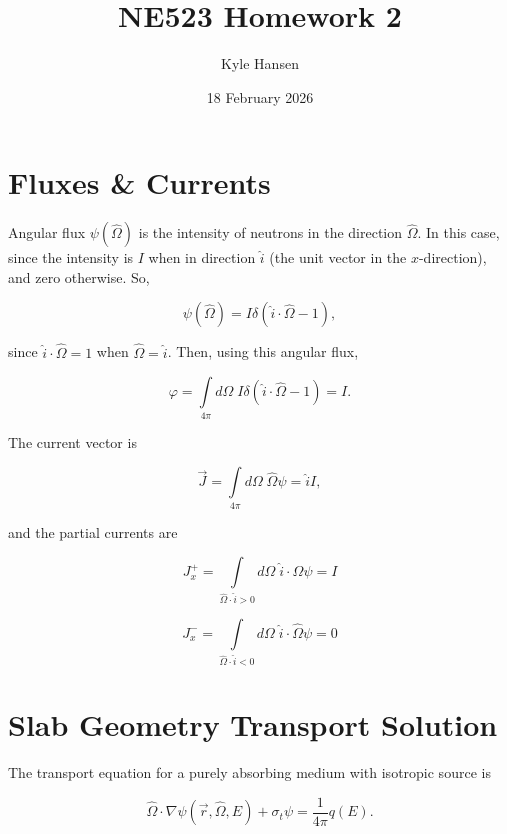 \documentclass{hw-template}
\title{NE523 Homework 2}
\author{Kyle Hansen}
\date{18 February 2026}
\begin{document}
\maketitle{}

\section{Fluxes \& Currents}

Angular flux $\psi({\hat{\Omega}})$ is the intensity of neutrons in the direction $\hat{\Omega}$. In this case, since the intensity is $I$ when in direction $\hat{i}$ (the unit vector in the $x$-direction), and zero otherwise. So,

\begin{equation}
    \psi(\hat{\Omega}) = I\delta(\hat{i}\cdot \hat{\Omega} - 1),
\end{equation}

since $\hat{i}\cdot \hat{\Omega}=1$ when $\hat{\Omega} = \hat{i}$. Then, using this angular flux,

\begin{equation}
    \varphi = \int\limits_{4\pi}d\Omega \; I\delta(\hat{i}\cdot \hat{\Omega} - 1) = I.
\end{equation}

The current vector is

\begin{equation}
    \vec{J} = \int\limits_{4\pi}d\Omega\; \hat{\Omega}\psi  = \hat{i}I,
\end{equation}

and the partial currents are 

\begin{equation}
    J_x^+ = \int\limits_{\hat{\Omega}\cdot \hat{i}>0}d\Omega\; \hat{i}\cdot\hat{\Omega}\psi = I
\end{equation}

\begin{equation}
    J_x^- = \int\limits_{\hat{\Omega}\cdot \hat{i}<0}d\Omega\; \hat{i}\cdot\hat{\Omega}\psi = 0
\end{equation}

\section{Slab Geometry Transport Solution}

The transport equation for a purely absorbing medium with isotropic source is

\begin{equation}
    \hat{\Omega}\cdot \nabla \psi(\vec{r}, \hat{\Omega}, E) + \sigma_t\psi = \frac{1}{4\pi}q(E).
\end{equation}
\end{document}
